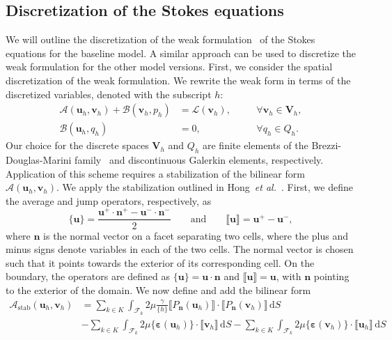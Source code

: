 \documentclass[fleqn]{wlscirep}
\newcommand{\intF}[1]{\int_{\mathcal{F}_k}#1 \, \mathrm dS}
\newcommand{\avg}[1]{\{#1\}}
\newcommand{\jump}[1]{\llbracket#1\rrbracket}
\newcommand{\nn}{\mathbf{n}}
\newcommand{\uu}{\mathbf{u}}
\newcommand{\vv}{\mathbf{v}}
\newcommand{\VV}{\mathbf{V}}
\newcommand{\beps}{\bm{\varepsilon}}
\begin{document}
\subsection{Discretization of the Stokes equations}
We will outline the discretization of the weak
formulation~
of the Stokes equations for the baseline model. A similar approach can
be used to discretize the weak formulation for the other model versions.
First, we consider the spatial discretization of the weak formulation.
We rewrite the weak form in terms of the discretized variables,
denoted with the subscript $h$:
\begin{subequations}
    \begin{alignat}{2}
        \mathcal{A}(\uu_h, \vv_h) + \mathcal{B}(\vv_h, p_h)
        &= \mathcal{L}(\vv_h), &&\quad\forall\vv_h\in\VV_h, \\
        \mathcal{B}(\uu_h, q_h) &= 0, &&\quad\forall q_h\in Q_h.
    \end{alignat}%
    \label{eq:no_stabilization_abstract_discrete_weak_form_modelC}%
\end{subequations}%
Our choice for the discrete spaces $\VV_h$ and $Q_h$ are finite elements
of the Brezzi-Douglas-Marini family~\cite{Brezzi1985TwoProblems} and
discontinuous Galerkin elements, respectively. Application of this scheme
requires a stabilization of the bilinear form $\mathcal{A}(\uu_h, \vv_h)$.
We apply the stabilization outlined in Hong~\emph{et al.}~\cite{Hong2016AEquations}.
First, we define the average and jump operators, respectively, as
\begin{equation*}
    \avg{\uu} = \frac{\uu^+\cdot\nn^+ - \uu^-\cdot\nn^-}{2}
    \qquad\mathrm{and}\qquad \jump{\uu} = \uu^+ - \uu^-,
\end{equation*}
where $\nn$ is the normal vector on a facet separating two cells,
where the plus and minus signs denote variables in each of the two cells.
The normal vector is chosen such that it points towards the exterior of
its corresponding cell. On the boundary, the operators are defined as
$\avg{\uu} = \uu\cdot\nn$ and $\jump{\uu} = \uu$,
with $\nn$ pointing to the exterior of the domain. We now define
and add the bilinear form
\begin{align*}
    \mathcal{A}_{\mathrm{stab}}(\uu_h, \vv_h) &=
    \sum_{k\in K}\intF{2\mu\frac{\gamma}{\avg{h}}\jump{P_{\nn}(\uu_h)}\cdot \jump{P_{\nn}(\vv_h)}}\\
    &-\sum_{k\in K}\intF{2\mu\avg{\beps(\uu_h)}\cdot\jump{\vv_h}}
    -\sum_{k\in K}\intF{2\mu\avg{\beps(\vv_h)}\cdot\jump{\uu_h}}
\end{align*}
\end{document}

